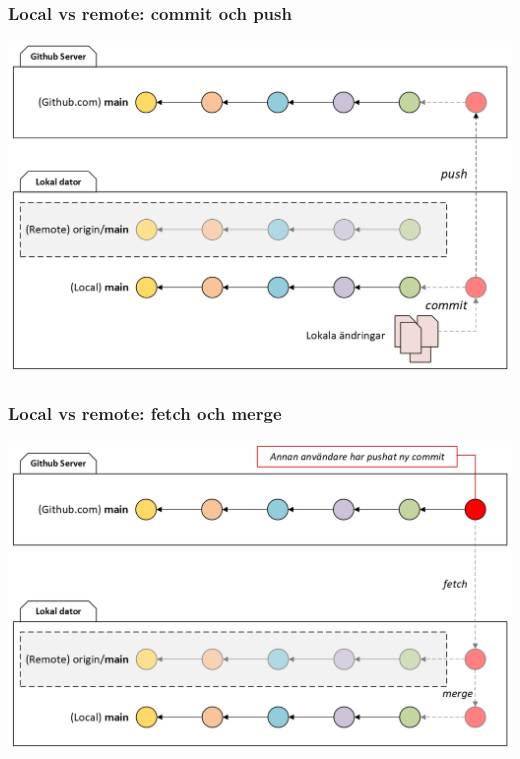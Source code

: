 \begin{frame}
    \frametitle{Local vs remote: commit och push}

    \begin{center}
        \includegraphics[width=.9\textwidth]{figs/local_remote_commit_push.png}
    \end{center}

\end{frame}

\begin{frame}
    \frametitle{Local vs remote: fetch och merge}

    \begin{center}
        \includegraphics[width=.9\textwidth]{figs/local_remote_fetch_merge.png}
    \end{center}

\end{frame}

